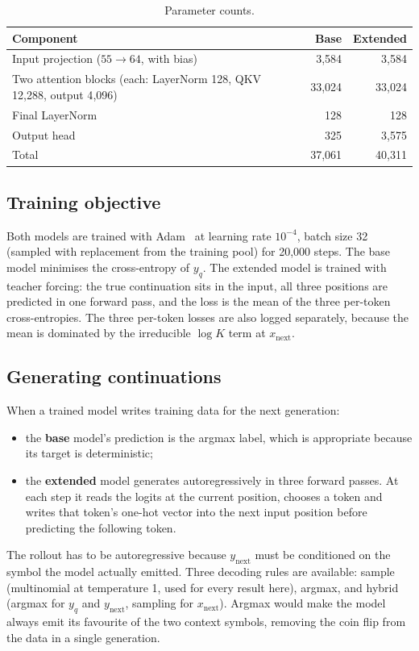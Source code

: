 \documentclass[11pt,a4paper]{article}
\newcommand{\xnext}{x_{\mathrm{next}}}
\newcommand{\ynext}{y_{\mathrm{next}}}
\newcommand{\yq}{y_{q}}
\DeclareRobustCommand{\code}[1]{\begingroup\ttfamily\def\_{\textunderscore\allowbreak}#1\endgroup}
\begin{document}
\begin{table}[htbp]
\centering
\small
\caption{Parameter counts.}
\label{tab:params}
\begin{tabular}{lrr}
\toprule
Component & Base & Extended\\
\midrule
Input projection ($55\to 64$, with bias) & 3{,}584 & 3{,}584\\
Two attention blocks (each: LayerNorm 128, QKV 12{,}288, output 4{,}096) & 33{,}024 & 33{,}024\\
Final LayerNorm & 128 & 128\\
Output head & 325 & 3{,}575\\
\midrule
Total & 37{,}061 & 40{,}311\\
\bottomrule
\end{tabular}
\end{table}

\subsection{Training objective}
Both models are trained with Adam~\cite{kingma2015} at learning rate $10^{-4}$,
batch size 32 (sampled with replacement from the training pool) for 20{,}000
steps. The base model minimises the cross-entropy of $\yq$. The extended model
is trained with teacher forcing: the true continuation sits in the input, all
three positions are predicted in one forward pass, and the loss is the mean of
the three per-token cross-entropies. The three per-token losses are also
logged separately, because the mean is dominated by the irreducible $\log K$
term at $\xnext$.

\subsection{Generating continuations}
When a trained model writes training data for the next generation:
\begin{itemize}[leftmargin=1.4em]
  \item the \textbf{base} model's prediction is the argmax label, which is
        appropriate because its target is deterministic;
  \item the \textbf{extended} model generates autoregressively in three
        forward passes. At each step it reads the logits at the current
        position, chooses a token and writes that token's one-hot vector into
        the next input position before predicting the following token.
\end{itemize}
The rollout has to be autoregressive because $\ynext$ must be conditioned on
the symbol the model actually emitted. Three decoding rules are available:
\code{sample} (multinomial at temperature 1, used for every result here),
\code{argmax}, and \code{hybrid} (argmax for $\yq$ and $\ynext$, sampling for
$\xnext$). Argmax would make the model always emit its favourite of the two
context symbols, removing the coin flip from the data in a single generation.
\end{document}
